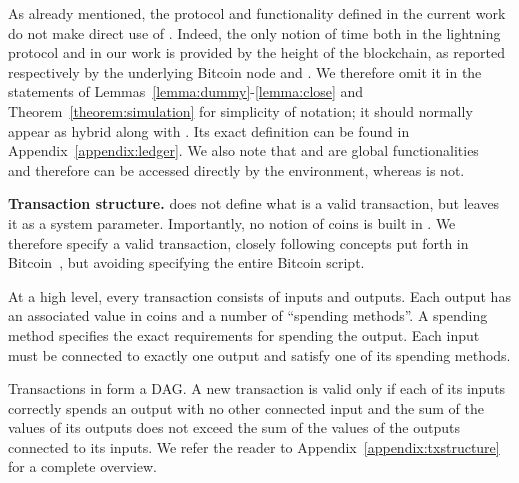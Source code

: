     As already mentioned, the protocol and functionality defined in the
    current work do not make direct use of \Fclock. Indeed, the only
    notion of time both in the lightning protocol and in our work is provided by
    the height of the blockchain, as reported respectively by the underlying
    Bitcoin node and \ledger. We therefore omit it in the statements
    of Lemmas~\ref{lemma:dummy}-\ref{lemma:close} and
    Theorem~\ref{theorem:simulation} for simplicity of notation; it
    should normally appear as hybrid along with \ledger. Its exact
    definition can be found in Appendix~\ref{appendix:ledger}. We also note that
    \ledger{} and \Fclock are global functionalities~\cite{globaluc} and
    therefore can be accessed directly by the environment, whereas \fpaynet{}
    is not.

  \noindent \textbf{Transaction structure.}
    \ledger{} does not define what is a valid transaction, but leaves it as a
    system parameter. Importantly, no notion of coins is built in \ledger. We
    therefore specify a valid transaction, closely following concepts put forth
    in Bitcoin~\cite{bitcoin}, but avoiding specifying the entire Bitcoin
    script.

    At a high level, every transaction consists of inputs and outputs. Each
    output has an associated value in coins and a number of ``spending
    methods''. A spending method specifies the exact requirements for spending
    the output. Each input must be connected to exactly one output and satisfy
    one of its spending methods.

    Transactions in \ledger{} form a DAG. A new transaction is valid only if
    each of its inputs correctly spends an output with no other connected input
    and the sum of the values of its outputs does not exceed the sum of the
    values of the outputs connected to its inputs. We refer the reader to
    Appendix~\ref{appendix:txstructure} for a complete overview.

